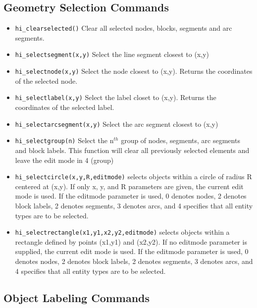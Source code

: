\subsection{Geometry Selection Commands}

\begin{itemize}
\item {\tt hi\_clearselected()} Clear all selected nodes, blocks, segments and arc
segments.

\item {\tt hi\_selectsegment(x,y)} Select the line segment closest to (x,y)

\item {\tt hi\_selectnode(x,y)} Select the node closest to (x,y).
Returns the coordinates of the selected node.

\item {\tt hi\_selectlabel(x,y)} Select the label closet to (x,y).
Returns the coordinates of the selected label.

\item {\tt hi\_selectarcsegment(x,y)} Select the arc segment closest to (x,y)

\item {\tt hi\_selectgroup(n)} Select the n$^{th}$ group of nodes, segments, arc
segments and block labels. This function will clear all previously selected
elements and leave the edit mode in 4 (group)

\item{\tt hi\_selectcircle(x,y,R,editmode)} selects objects within a circle of radius
R centered at (x,y).  If only x, y, and R parameters are given, the current
edit mode is used.  If the editmode parameter is used, 0 denotes nodes, 2
denotes block labels, 2 denotes segments, 3 denotes arcs, and 4 specifies
that all entity types are to be selected.

\item{\tt hi\_selectrectangle(x1,y1,x2,y2,editmode)} selects objects within a rectangle
defined by points (x1,y1) and (x2,y2). If no editmode parameter is supplied,
the current edit mode is used.  If the editmode parameter is used, 0 denotes
nodes, 2 denotes block labels, 2 denotes segments, 3 denotes arcs, and 4 
specifies that all entity types are to be selected.
\end{itemize}


\subsection{Object Labeling Commands}

